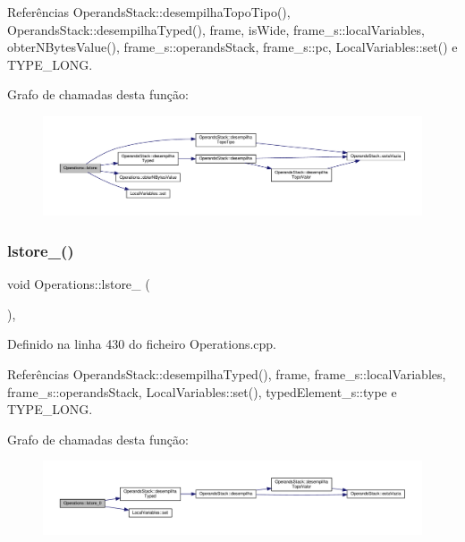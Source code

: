 Referências Operands\+Stack\+::desempilha\+Topo\+Tipo(), Operands\+Stack\+::desempilha\+Typed(), frame, is\+Wide, frame\+\_\+s\+::local\+Variables, obter\+N\+Bytes\+Value(), frame\+\_\+s\+::operands\+Stack, frame\+\_\+s\+::pc, Local\+Variables\+::set() e T\+Y\+P\+E\+\_\+\+L\+O\+NG.

Grafo de chamadas desta função\+:\nopagebreak
\begin{figure}[H]
\begin{center}
\leavevmode
\includegraphics[width=350pt]{classOperations_a233917ec136fa6ce064f04b410e15f87_cgraph}
\end{center}
\end{figure}
\mbox{\label{classOperations_ae3c949d56a3ee685668134493595334b}} 
\subsubsection{\texorpdfstring{lstore\+\_()}{lstore\_0()}}
{\footnotesize\ttfamily void Operations\+::lstore\+\_ (\begin{DoxyParamCaption}{ }\end{DoxyParamCaption})\hspace{0.3cm}{\ttfamily [static]}, {\ttfamily [private]}}



Definido na linha 430 do ficheiro Operations.\+cpp.



Referências Operands\+Stack\+::desempilha\+Typed(), frame, frame\+\_\+s\+::local\+Variables, frame\+\_\+s\+::operands\+Stack, Local\+Variables\+::set(), typed\+Element\+\_\+s\+::type e T\+Y\+P\+E\+\_\+\+L\+O\+NG.

Grafo de chamadas desta função\+:\nopagebreak
\begin{figure}[H]
\begin{center}
\leavevmode
\includegraphics[width=350pt]{classOperations_ae3c949d56a3ee685668134493595334b_cgraph}
\end{center}
\end{figure}
\mbox{\label{classOperations_aa162cef00367e3d5fb5dca12494a5793}} 
